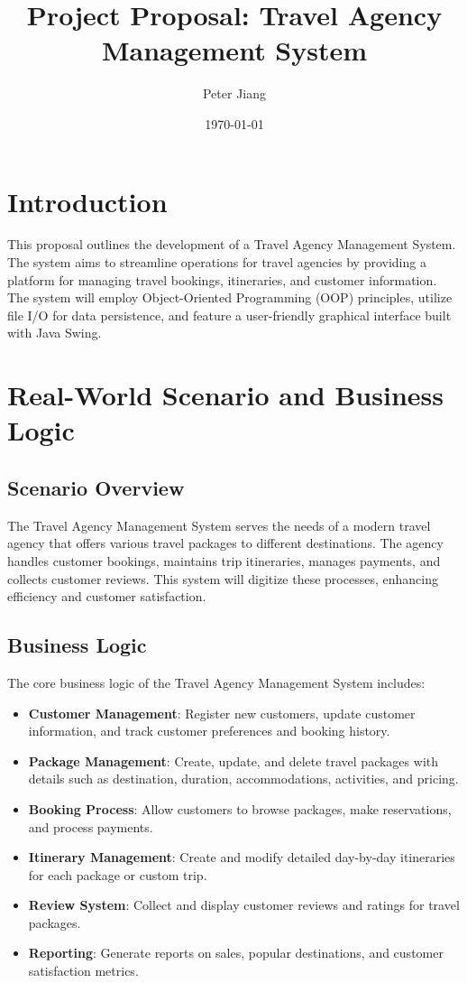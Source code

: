 \documentclass[12pt]{article}
\title{\textbf{Project Proposal: Travel Agency Management System}}
\author{Peter Jiang}
\date{\today}
\begin{document}
\maketitle

\section{Introduction}
This proposal outlines the development of a Travel Agency Management System. The system aims to streamline operations for travel agencies by providing a platform for managing travel bookings, itineraries, and customer information. The system will employ Object-Oriented Programming (OOP) principles, utilize file I/O for data persistence, and feature a user-friendly graphical interface built with Java Swing.

\section{Real-World Scenario and Business Logic}

\subsection{Scenario Overview}
The Travel Agency Management System serves the needs of a modern travel agency that offers various travel packages to different destinations. The agency handles customer bookings, maintains trip itineraries, manages payments, and collects customer reviews. This system will digitize these processes, enhancing efficiency and customer satisfaction.

\subsection{Business Logic}
The core business logic of the Travel Agency Management System includes:

\begin{itemize}
    \item \textbf{Customer Management}: Register new customers, update customer information, and track customer preferences and booking history.
    
    \item \textbf{Package Management}: Create, update, and delete travel packages with details such as destination, duration, accommodations, activities, and pricing.
    
    \item \textbf{Booking Process}: Allow customers to browse packages, make reservations, and process payments.
    
    \item \textbf{Itinerary Management}: Create and modify detailed day-by-day itineraries for each package or custom trip.
    
    \item \textbf{Review System}: Collect and display customer reviews and ratings for travel packages.
    
    \item \textbf{Reporting}: Generate reports on sales, popular destinations, and customer satisfaction metrics.
\end{itemize}
\end{document}
